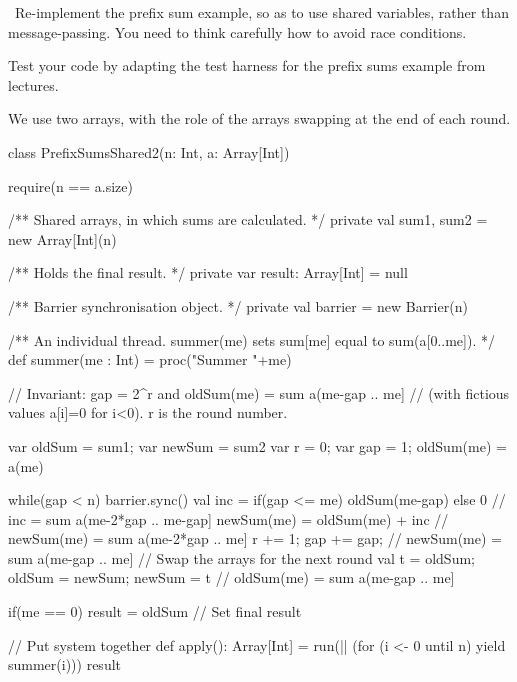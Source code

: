 \begin{question}
\Programming\ 
Re-implement the prefix sum example, so as to use shared variables, rather
than message-passing.  You need to think carefully how to avoid race
conditions.  

Test your code by adapting the test harness for the prefix sums example from
lectures. 
\end{question}


\begin{answer}
We use two arrays, with the role of the arrays swapping at the end of each
round. 
%
\begin{scala}
class PrefixSumsShared2(n: Int, a: Array[Int]){
  require(n == a.size)

  /** Shared arrays, in which sums are calculated. */
  private val sum1, sum2 = new Array[Int](n) 

  /** Holds the final result. */
  private var result: Array[Int] = null

  /** Barrier synchronisation object. */
  private val barrier = new Barrier(n)

  /** An individual thread.  summer(me) sets sum[me] equal to sum(a[0..me]). */
  def summer(me : Int) = proc("Summer "+me){
    // Invariant: gap = 2^r and oldSum(me) = sum a(me-gap .. me] 
    // (with fictious values a[i]=0 for i<0).  r is the round number.
    
    var oldSum = sum1; var newSum = sum2
    var r = 0; var gap = 1; oldSum(me) = a(me)

    while(gap < n){ 
      barrier.sync()
      val inc = if(gap <= me) oldSum(me-gap) else 0 
                                             // inc = sum a(me-2*gap .. me-gap]
      newSum(me) = oldSum(me) + inc  // newSum(me) = sum a(me-2*gap .. me]
      r += 1; gap += gap;                  // newSum(me) = sum a(me-gap .. me]
      // Swap the arrays for the next round
      val t = oldSum; oldSum = newSum; newSum = t 
                                           // oldSum(me) = sum a(me-gap .. me]
    }

    if(me == 0) result = oldSum        // Set final result
  }

  // Put system together
  def apply(): Array[Int] = {
    run(|| (for (i <- 0 until n) yield summer(i)))
    result
  }
}
\end{scala}




\end{answer}

